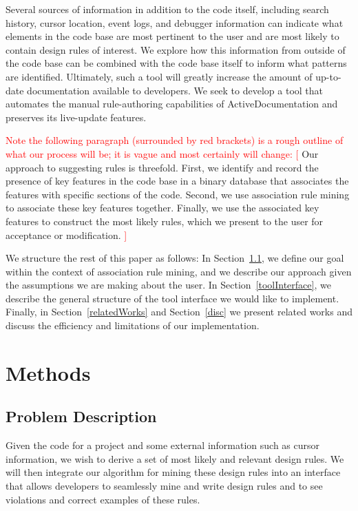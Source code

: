 \documentclass[12pt]{article}
\newcommand{\tcr}{\textcolor{red}}
\begin{document}
Several sources of information in addition to the code itself, including search history, cursor location, event logs, and debugger information can indicate what elements in the code base are most pertinent to the user and are most likely to contain design rules of interest. We explore how this information from outside of the code base can be combined with the code base itself to inform what patterns are identified. Ultimately, such a tool will greatly increase the amount of up-to-date documentation available to developers. We seek to develop a tool that automates the manual rule-authoring capabilities of ActiveDocumentation \cite{MehrpurEtAl2019} and preserves its live-update features.

\tcr{Note the following paragraph (surrounded by red brackets) is a rough outline of what our process will be; it is vague and most certainly will change: [ }Our approach to suggesting rules is threefold. First, we identify and record the presence of key features in the code base in a binary database that associates the features with specific sections of the code. Second, we use association rule mining to associate these key features together. Finally, we use the associated key features to construct the most likely rules, which we present to the user for acceptance or modification. \tcr{]}
 
 We structure the rest of this paper as follows: In Section~\ref{probDesc}, we define our goal within the context of association rule mining, and we describe our approach given the assumptions we are making about the user. In Section~\ref{toolInterface}, we describe the general structure of the tool interface we would like to implement. Finally, in Section~\ref{relatedWorks} and Section~\ref{disc} we present related works and discuss the efficiency and limitations of our implementation.
 \clearpage


\section{Methods}\label{methods}

\subsection{Problem Description} \label{probDesc}

Given the code for a project and some external information such as cursor information, we wish to derive a set of most likely and relevant design rules. We will then integrate our algorithm for mining these design rules into an interface that allows developers to seamlessly mine and write design rules and to see violations and correct examples of these rules. 
\end{document}

